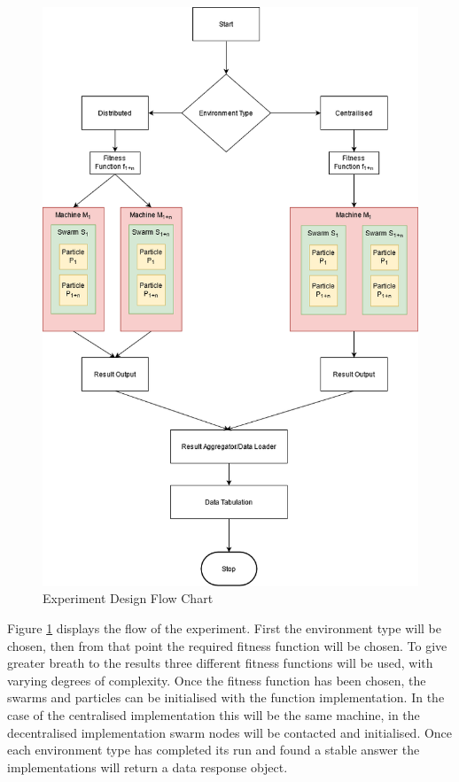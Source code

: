 \documentclass[oneside,12pt]{book}
\begin{document}
\begin{figure}[H]
    \centering
    \includegraphics[scale=0.6]{Images/ExperimentFlow.png}
    \caption{Experiment Design Flow Chart}
    \label{fig:Experiment Design Flow Chart}
\end{figure}
Figure \ref{fig:Experiment Design Flow Chart} displays the flow of the experiment. First the environment type will be chosen, then from that point the required fitness function will be chosen. To give greater breath to the results three different fitness functions will be used, with varying degrees of complexity. Once the fitness function has been chosen, the swarms and particles can be initialised with the function implementation. In the case of the centralised implementation this will be the same machine, in the decentralised implementation swarm nodes will be contacted and initialised. Once each environment type has completed its run and found a stable answer the implementations will return a data response object. 
\end{document}
